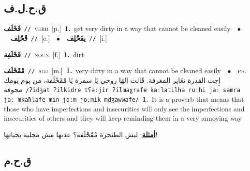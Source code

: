 \documentclass[10pt,a4paper,twoside]{article} %
\begin{document}
\begin{multicols}{2}
\vspace{-3mm}
\subsection*{\color{blue}\foreignlanguage{arabic}{ق.ح.ل.ف}\color{blue}{}} 

{\setlength\topsep{0pt}\textbf{\foreignlanguage{arabic}{قَحْلَف}}\ {\color{gray}\texttt{//}\color{black}}\ \textsc{verb}\ [p.]\ \textbf{1.}~get very dirty in a way that cannot be cleaned easily\ \ $\bullet$\ \ \setlength\topsep{0pt}\textbf{\foreignlanguage{arabic}{قَحْلِف}}\ {\color{gray}\texttt{//}\color{black}}\ [c.]\ \ $\bullet$\ \ \setlength\topsep{0pt}\textbf{\foreignlanguage{arabic}{يقَحْلِف}}\ {\color{gray}\texttt{//}\color{black}}\ [i.]\ } \vspace{2mm}

{\setlength\topsep{0pt}\textbf{\foreignlanguage{arabic}{قَحْلَفِة}}\ {\color{gray}\texttt{//}\color{black}}\ \textsc{noun}\ [f.]\ \textbf{1.}~dirt\ } \vspace{2mm}

{\setlength\topsep{0pt}\textbf{\foreignlanguage{arabic}{مْقَحْلَف}}\ {\color{gray}\texttt{//}\color{black}}\ \textsc{adj}\ [m.]\ \textbf{1.}~very dirty in a way that cannot be cleaned easily\ \ $\bullet$\ \ \textsc{ph.} \color{gray} \foreignlanguage{arabic}{إِجت القدرة تعَاير المغرفة. قَالت الهَا روحي يَا سمرة يَا مْقَحْلَفة، من يوم يومك مجوفة}\color{black}\ {\color{gray}\texttt{/{\sffamily ʔidʒat ʔilkidre tʕaːjir ʔilmaɣrafe kaːlatilha ruːħi jaː samra jaː mkaħlafe min joːm joːmik mdʒawwafe}/}\color{black}}\ \textbf{1.}~It is a proverb that means that those who have imperfections and insecurities will only see the  imperfections and insecurities of others and they will keep reminding them in a very annoying way\  \begin{flushright}\color{gray}\foreignlanguage{arabic}{\textbf{\underline{\foreignlanguage{arabic}{أمثلة}}}: ليش الطنجرة مْقَحْلَفة؟ عدنها مش مجلية بحياتها!}\end{flushright}\color{black}} \vspace{2mm}

\vspace{-3mm}
\subsection*{\color{blue}\foreignlanguage{arabic}{ق.ح.م}\color{blue}{}} 


\end{multicols}
\end{document}

